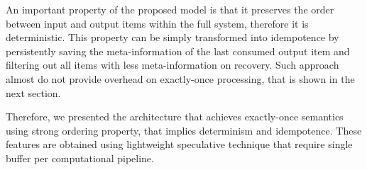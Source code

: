 \label {fs-short-discussion}

An important property of the proposed model is that it preserves the order between input and output items within the full system, therefore it is deterministic. This property can be simply transformed into idempotence by persistently saving the meta-information of the last consumed output item and filtering out all items with less meta-information on recovery. Such approach almost do not provide overhead on exactly-once processing, that is shown in the next section. 

Therefore, we presented the architecture that achieves exactly-once semantics using strong ordering property, that implies determinism and idempotence. These features are obtained using lightweight speculative technique that require single buffer per computational pipeline. 